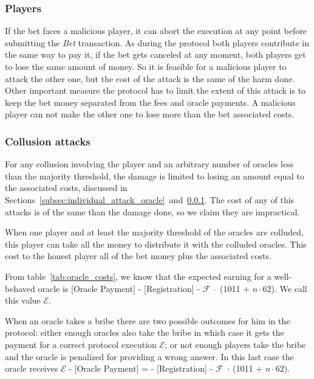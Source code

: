 \subsubsection{Players} \label{subsec:individual_attack_player}
If the bet faces a malicious player, it can abort the execution at any point
  before submitting the \textit{Bet} transaction.
As during the protocol both players contribute in the same way to pay it, if the bet
  gets canceled at any moment, both players get to lose the same amount of
  money.
So it is feasible for a malicious player to attack the other one, but the cost
  of the attack is the same of the harm done.
Other important measure the protocol has to limit the extent of this attack
  is to keep the bet money separated from the fees and oracle payments.
A malicious player can not make the other one to lose more than the bet
  associated costs.

\subsubsection{Collusion attacks}\label{subsec:colluded_attacks}

For any collusion involving the player and an arbitrary number of oracles less than
  the majority threshold, the damage is limited to losing an amount equal to the
  associated costs, discussed in
  Sections~\ref{subsec:individual_attack_oracle}~and~\ref{subsec:individual_attack_player}.
The cost of any of this attacks is of the same than the damage done, so we claim
  they are impractical.

When one player and at least the majority threshold of the oracles are colluded,
  this player can take all the money to distribute it with the colluded oracles.
This cost to the honest player all of the bet money plus the associated costs.

From table~\ref{tab:oracle_costs}, we know that the expected earning for a
  well-behaved oracle is
  [Oracle Payment] - [Registration] - $\mathcal{F}\, \cdot$ (1011 + $n \cdot 62$).
  We call this value $\mathcal{E}$.

When an oracle takes a bribe there are two possible outcomes for him in the
  protocol:
  either enough oracles also take the bribe in which case it gets the payment for a correct
  protocol execution $\mathcal{E}$; or not enough
  players take the bribe and the oracle is penalized for providing a wrong
  answer. In this last case the oracle receives
  $\mathcal{E}$ - [Oracle Payment] =
  - [Registration] - $\mathcal{F}$\, $\cdot$ (1011 + $n \cdot 62$).

